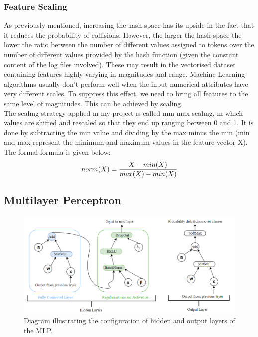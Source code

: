 \subsubsection*{Feature Scaling}

As previously mentioned, increasing the hash space has its upside in the fact that it reduces the probability of collisions. However, the larger the hash space the lower the ratio between the number of different values assigned to tokens over the number of different values provided by the hash function (given the constant content of the log files involved). These may result in the vectorised dataset containing features highly varying in magnitudes and range. Machine Learning algorithms usually don’t perform well when the input numerical attributes have very different scales. To suppress this effect, we need to bring all features to the same level of magnitudes. This can be achieved by scaling. \\

The scaling strategy applied in my project is called min-max scaling, in which values are
shifted and rescaled so that they end up ranging between 0 and 1. It is done by subtracting the min value and dividing by the max minus the min (min and max represent the minimum and maximum values in the feature vector X). The formal formula is given below: \\

\begin{equation}
    \centering
    norm(X) = \frac{X - min(X)}{max(X) - min(X)}
\end{equation}

\subsection{Multilayer Perceptron}
\begin{figure}[H]
  \centering
  \centerline{\includegraphics[scale=0.6]{Images/mlp_layers.png}}
  \caption{Diagram illustrating the configuration of hidden and output layers of the MLP.}
  \label{mlp_layers}
\end{figure}


